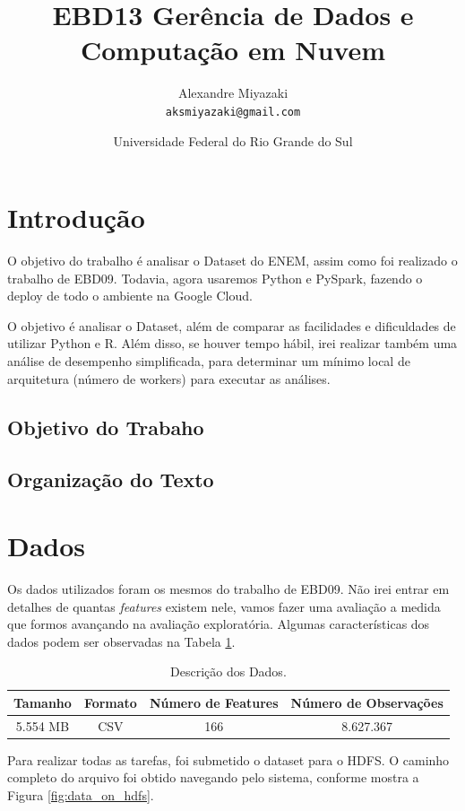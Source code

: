 \documentclass{article}
\title{EBD13 Gerência de Dados e Computação em Nuvem} %
\author{Alexandre Miyazaki\\ \texttt{aksmiyazaki@gmail.com}} %
\date{Universidade Federal do Rio Grande do Sul} %
\begin{document}
\maketitle %

\section{Introdução}
O objetivo do trabalho é analisar o Dataset do ENEM, assim como foi realizado o trabalho de EBD09. Todavia, agora usaremos Python e PySpark, fazendo o deploy de todo o ambiente na Google Cloud.

O objetivo é analisar o Dataset, além de comparar as facilidades e dificuldades de utilizar Python e R. Além disso, se houver tempo hábil, irei realizar também uma análise de desempenho simplificada, para determinar um mínimo local de arquitetura (número de workers) para executar as análises.


\subsection{Objetivo do Trabaho}

\subsection{Organização do Texto}

\newpage
\section{Dados}

Os dados utilizados foram os mesmos do trabalho de EBD09. Não irei entrar em detalhes de quantas \emph{features} existem nele, vamos fazer uma avaliação a medida que formos avançando na avaliação exploratória. Algumas características dos dados podem ser observadas na Tabela \ref{tab:data_data}.

\begin{table}[H]
\centering
\begin{tabular}{|c|c|c|c|}
\hline
Tamanho & Formato & Número de Features &  Número de Observações \\ \hline \hline
5.554 MB & CSV & 166 & 8.627.367 \\ \hline
\end{tabular}
\caption{Descrição dos Dados.}
\label{tab:data_data}
\end{table}

Para realizar todas as tarefas, foi submetido o dataset para o HDFS. O caminho completo do arquivo foi obtido navegando pelo sistema, conforme mostra a Figura \ref{fig:data_on_hdfs}.
\end{document}
